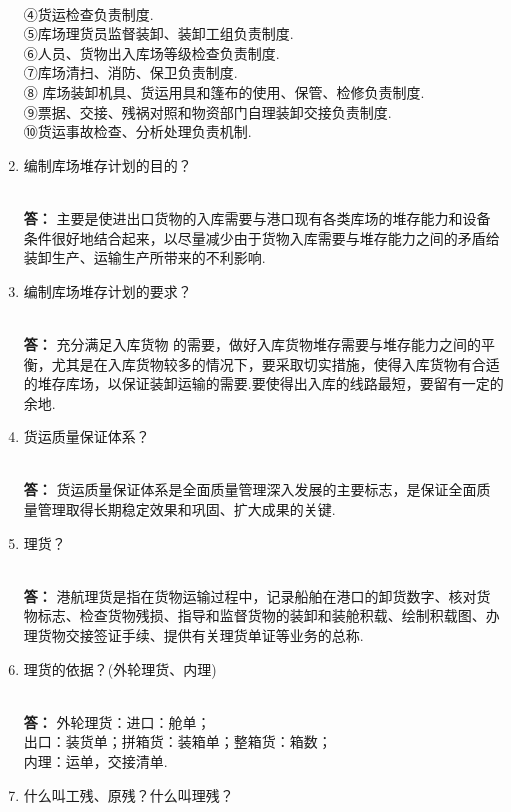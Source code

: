 \documentclass[UTF8]{ctexart}
\begin{document}
\begin{enumerate}[1]
\\④货运检查负责制度.
\\⑤库场理货员监督装卸、装卸工组负责制度.
\\⑥人员、货物出入库场等级检查负责制度.
\\⑦库场清扫、消防、保卫负责制度.
\\⑧ 库场装卸机具、货运用具和篷布的使用、保管、检修负责制度.
\\⑨票据、交接、残祸对照和物资部门自理装卸交接负责制度.
\\ ⑩货运事故检查、分析处理负责机制.
\item \begin{CJK}{UTF8}{you} 编制库场堆存计划的目的？
\end{CJK}
\\ \textbf{答：} 主要是使进出口货物的入库需要与港口现有各类库场的堆存能力和设备条件很好地结合起来，以尽量减少由于货物入库需要与堆存能力之间的矛盾给装卸生产、运输生产所带来的不利影响.
\item \begin{CJK}{UTF8}{you} 编制库场堆存计划的要求？
\end{CJK}
\\ \textbf{答：} 充分满足入库货物 的需要，做好入库货物堆存需要与堆存能力之间的平衡，尤其是在入库货物较多的情况下，要采取切实措施，使得入库货物有合适的堆存库场，以保证装卸运输的需要.要使得出入库的线路最短，要留有一定的余地.
\item \begin{CJK}{UTF8}{you} 货运质量保证体系？
\end{CJK}
\\ \textbf{答：} 货运质量保证体系是全面质量管理深入发展的主要标志，是保证全面质量管理取得长期稳定效果和巩固、扩大成果的关键.
\item \begin{CJK}{UTF8}{you} 理货？
\end{CJK}
\\ \textbf{答：} 港航理货是指在货物运输过程中，记录船舶在港口的卸货数字、核对货物标志、检查货物残损、指导和监督货物的装卸和装舱积载、绘制积载图、办理货物交接签证手续、提供有关理货单证等业务的总称.
\item \begin{CJK}{UTF8}{you} 理货的依据？(外轮理货、内理)
\end{CJK}
\\ \textbf{答：} 外轮理货：进口：舱单；\\出口：装货单；拼箱货：装箱单；整箱货：箱数；\\内理：运单，交接清单.
\item \begin{CJK}{UTF8}{you} 什么叫工残、原残？什么叫理残？

\end{CJK}
\end{enumerate}
\end{document}
